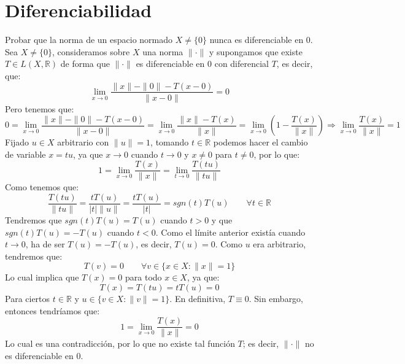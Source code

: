 \section{Diferenciabilidad}

\begin{ejercicio}
Probar que la norma de un espacio normado \( X \neq \{0\} \) nunca es diferenciable en 0.\\

\noindent
Sea $X\neq \{0\}$, consideramos sobre $X$ una norma $\|\cdot\|$ y supongamos que existe $T\in L(X,\mathbb{R})$ de forma que $\|\cdot\|$ es diferenciable en 0 con diferencial $T$, es decir, que:
\begin{equation*}
    \lim_{x\to0}\dfrac{\|x\| - \|0\| - T(x-0)}{\|x-0\|} = 0
\end{equation*}
Pero tenemos que:
\begin{equation*}
    0 = \lim_{x\to0}\dfrac{\|x\| - \|0\| - T(x-0)}{\|x-0\|} = \lim_{x\to0}\dfrac{\|x\|-T(x)}{\|x\|} = \lim_{x\to0}\left(1-\dfrac{T(x)}{\|x\|}\right)  \Longrightarrow \lim_{x\to0}\dfrac{T(x)}{\|x\|} = 1
\end{equation*}
Fijado $u\in X$ arbitrario con $\|u\| = 1$, tomando $t\in \mathbb{R}$ podemos hacer el cambio de variable $x = tu$, ya que $x\to 0$ cuando $t\to 0$ y $x\neq 0$ para $t\neq 0$, por lo que:
\begin{equation*}
    1 = \lim_{x\to0}\dfrac{T(x)}{\|x\|} = \lim_{t\to0}\dfrac{T(tu)}{\|tu\|} 
\end{equation*}
Como tenemos que:
\begin{equation*}
    \dfrac{T(tu)}{\|tu\|} = \dfrac{tT(u)}{|t|\|u\|} = \dfrac{tT(u)}{|t|} = sgn(t)T(u) \qquad \forall t\in \mathbb{R}
\end{equation*}
Tendremos que $sgn(t)T(u) = T(u)$ cuando $t>0$ y que $sgn(t)T(u) = -T(u)$ cuando $t<0$. Como el límite anterior existía cuando $t\to 0$, ha de ser $T(u) = -T(u)$, es decir, $T(u) = 0$. Como $u$ era arbitrario, tendremos que:
\begin{equation*}
    T(v) = 0 \qquad \forall v\in \{x\in X : \|x\| = 1\}
\end{equation*}
Lo cual implica que $T(x) = 0$ para todo $x\in X$, ya que:
\begin{equation*}
    T(x) = T(tu) = tT(u) = 0
\end{equation*}
Para ciertos $t\in \mathbb{R}$ y $u \in \{v\in X : \|v\| = 1\}$. En definitiva, $T\equiv 0$. Sin embargo, entonces tendríamos que:
\begin{equation*}
    1 = \lim_{x\to0}\dfrac{T(x)}{\|x\|} = 0
\end{equation*}
Lo cual es una contradicción, por lo que no existe tal función $T$; es decir, $\|\cdot\|$ no es diferenciable en 0.
\end{ejercicio}


